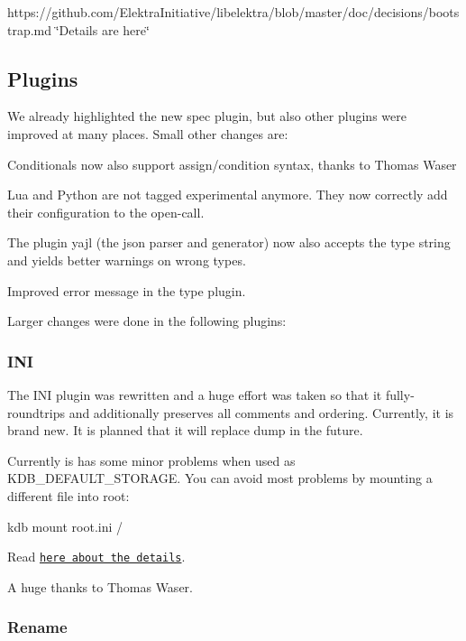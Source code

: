 https\+://github.com/\+Elektra\+Initiative/libelektra/blob/master/doc/decisions/bootstrap.\+md \char`\"{}\+Details are here\char`\"{}

\subsection*{Plugins}

We already highlighted the new {\ttfamily spec} plugin, but also other plugins were improved at many places. Small other changes are\+:


\begin{DoxyItemize}
\item Conditionals now also support {\ttfamily assign/condition} syntax, thanks to Thomas Waser
\item Lua and Python are not tagged experimental anymore. They now correctly add their configuration to the open-\/call.
\item The plugin {\ttfamily yajl} (the json parser and generator) now also accepts the type {\ttfamily string} and yields better warnings on wrong types.
\item Improved error message in the {\ttfamily type} plugin.
\end{DoxyItemize}

Larger changes were done in the following plugins\+:

\subsubsection*{I\+N\+I}

The I\+N\+I plugin was rewritten and a huge effort was taken so that it fully-\/roundtrips and additionally preserves all comments and ordering. Currently, it is brand new. It is planned that it will replace {\ttfamily dump} in the future.

Currently is has some minor problems when used as K\+D\+B\+\_\+\+D\+E\+F\+A\+U\+L\+T\+\_\+\+S\+T\+O\+R\+A\+G\+E. You can avoid most problems by mounting a different file into root\+: \begin{DoxyVerb}    kdb mount root.ini /
\end{DoxyVerb}


Read \href{https://github.com/ElektraInitiative/libelektra/tree/master/src/plugins/ini}{\tt here about the details}.

A huge thanks to Thomas Waser.

\subsubsection*{Rename}

